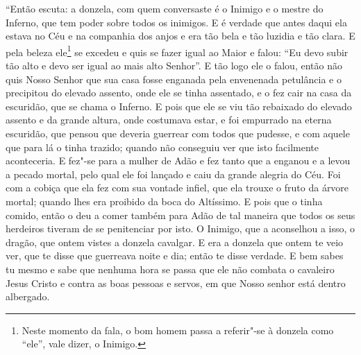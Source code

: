 “Então escuta: a donzela, com quem conversaste é o Inimigo e o mestre do
Inferno, que tem poder sobre todos os inimigos. E é verdade que antes daqui ela
estava no Céu e na companhia dos anjos e era tão bela e tão luzidia e tão
clara. E pela beleza ele\footnote{ Neste momento da fala, o bom homem passa a
referir"-se à donzela como “ele”, vale dizer, o Inimigo.}  se
excedeu e quis se fazer igual ao Maior e falou: “Eu devo subir tão alto e devo
ser igual ao mais alto Senhor”. E tão logo ele o falou, então não quis Nosso
Senhor que sua casa fosse enganada pela envenenada petulância e o precipitou do
elevado assento, onde ele se tinha assentado, e o fez cair na casa da
escuridão, que se chama o Inferno. E pois que ele se viu tão rebaixado do
elevado assento e da grande altura, onde costumava estar, e foi empurrado na
eterna escuridão, que pensou que deveria guerrear com todos que pudesse, e com
aquele que para lá o tinha trazido; quando não conseguiu ver que isto
facilmente aconteceria. E fez"-se para a mulher de Adão e fez tanto que a
enganou e a levou a pecado mortal, pelo qual ele foi lançado e caiu da grande
alegria do Céu. Foi com a cobiça que ela fez com sua vontade infiel, que ela
trouxe o fruto da árvore mortal; quando lhes era proibido da boca do
Altíssimo. E pois que o tinha comido, então o deu a comer também para Adão de
tal maneira que todos os seus herdeiros tiveram de se penitenciar por isto. O
Inimigo, que a aconselhou a isso, o dragão, que ontem vistes a donzela
cavalgar. E era a donzela que ontem te veio ver, que te disse que guerreava
noite e dia; então te disse verdade. E bem sabes tu mesmo e sabe que nenhuma
hora se passa que ele não combata o cavaleiro Jesus Cristo e contra as boas
pessoas e servos, em que Nosso senhor está dentro albergado. 


